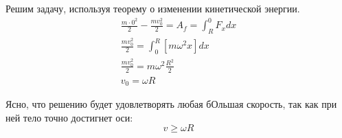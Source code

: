 \documentclass[a5paper,10pt]{article}
\makeatletter
\newif\if@gather@prefix
\newcommand*{\beforetext}[1]{%
  \ifmeasuring@\else
  \gdef\gather@prefix{#1}%
  \global\@gather@prefixtrue 
  \fi
}
\makeatother
\begin{document}
Решим задачу, используя теорему о изменении кинетической энергии.
\begin{gather}
    \frac{m\cdot0^2}{2}-\frac{mv_0^2}{2}=A_f=\int_R^0F_xdx\\
    \frac{mv_0^2}{2}=\int_0^R[m\omega^2x]dx\\
    \frac{mv_0^2}{2}=m\omega^2\frac{R^2}{2}\\
    v_0=\omega{R}
%
\end{gather}

Ясно, что решению будет удовлетворять любая бОльшая скорость, так как при ней 
тело точно достигнет оси:
\begin{equation}
    v\geq \omega{R}
\end{equation}
\end{document}
